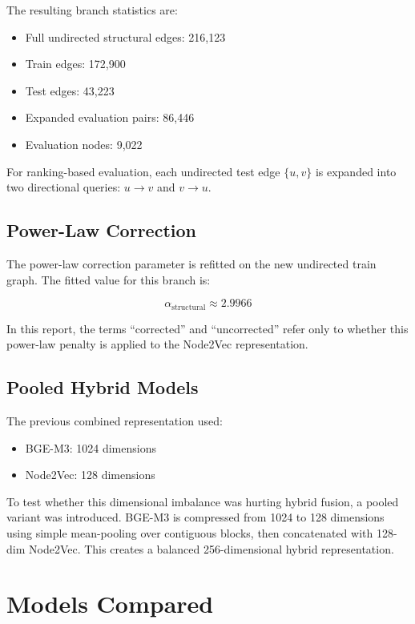 \documentclass[11pt,a4paper]{article}
\begin{document}
The resulting branch statistics are:

\begin{itemize}
    \item Full undirected structural edges: 216,123
    \item Train edges: 172,900
    \item Test edges: 43,223
    \item Expanded evaluation pairs: 86,446
    \item Evaluation nodes: 9,022
\end{itemize}

For ranking-based evaluation, each undirected test edge $\{u,v\}$ is expanded
into two directional queries: $u \rightarrow v$ and $v \rightarrow u$.

\subsection{Power-Law Correction}
The power-law correction parameter is refitted on the new undirected train
graph. The fitted value for this branch is:

\[
\alpha_{\text{structural}} \approx 2.9966
\]

In this report, the terms ``corrected'' and ``uncorrected'' refer only to
whether this power-law penalty is applied to the Node2Vec representation.

\subsection{Pooled Hybrid Models}
The previous combined representation used:

\begin{itemize}
    \item BGE-M3: 1024 dimensions
    \item Node2Vec: 128 dimensions
\end{itemize}

To test whether this dimensional imbalance was hurting hybrid fusion, a pooled
variant was introduced. BGE-M3 is compressed from 1024 to 128 dimensions using
simple mean-pooling over contiguous blocks, then concatenated with 128-dim
Node2Vec. This creates a balanced 256-dimensional hybrid representation.

\section{Models Compared}
\end{document}
